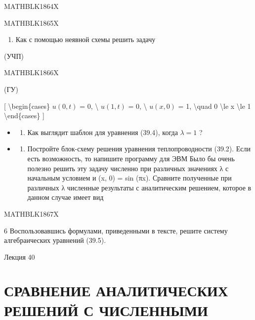 \documentclass[
]{article}
\providecommand{\tightlist}{%
  \setlength{\itemsep}{0pt}\setlength{\parskip}{0pt}}
\begin{document}
{{{MATHBLK1864X

MATHBLK1865X

\begin{enumerate}
\def\labelenumi{\arabic{enumi}.}
\setcounter{enumi}{2}
\tightlist
\item
  Как с помощью неявной схемы решить задачу
\end{enumerate}

(УЧП)

MATHBLK1866X

(ГУ)

{[} \textbackslash begin\{cases\} \(u(0, t)\) = 0, \textbackslash{}
\(u(1, t)\) = 0, \textbackslash{} \(u(x, 0)\) = 1, \textbackslash quad 0
\textbackslash le x \textbackslash le 1 \textbackslash end\{cases\} {]}

\begin{itemize}
\tightlist
\item
  \begin{enumerate}
  \def\labelenumi{\arabic{enumi}.}
  \setcounter{enumi}{3}
  \tightlist
  \item
    Как выглядит шаблон для уравнения (39.4), когда \(\lambda = 1\) ?
  \end{enumerate}
\item
  \begin{enumerate}
  \def\labelenumi{\arabic{enumi}.}
  \setcounter{enumi}{4}
  \tightlist
  \item
    Постройте блок-схему решения уравнения теплопроводности (39.2). Если
    есть возможность, то напишите программу для ЭВМ Было бы очень
    полезно решить эту задачу численно при различных значениях λ с
    начальным условием и (x, 0) = sin (πx). Сравните полученные при
    различных λ численные результаты с аналитическим решением, которое в
    данном случае имеет вид
  \end{enumerate}
\end{itemize}

MATHBLK1867X

6 Воспользовавшись формулами, приведенными в тексте, решите систему
алгебраических уравнений (39.5).

Лекция 40

\section{СРАВНЕНИЕ АНАЛИТИЧЕСКИХ РЕШЕНИЙ С
ЧИСЛЕННЫМИ}\label{ux441ux440ux430ux432ux43dux435ux43dux438ux435-ux430ux43dux430ux43bux438ux442ux438ux447ux435ux441ux43aux438ux445-ux440ux435ux448ux435ux43dux438ux439-ux441-ux447ux438ux441ux43bux435ux43dux43dux44bux43cux438}

}}}
\end{document}
